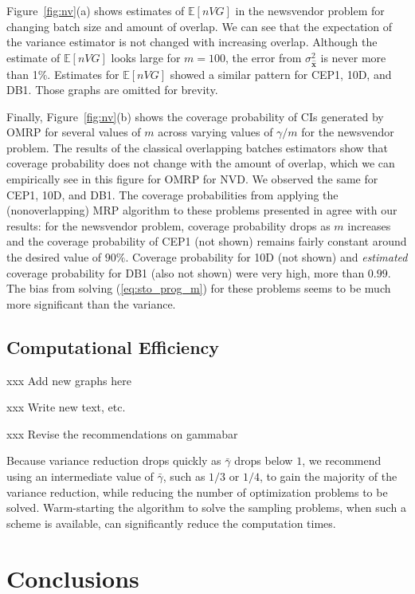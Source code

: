 \documentclass[12pt]{article}
\newcommand{\e}[1]{\mathbb{E} \left[ #1 \right]
}
\newcommand{\x}{\mathbf{x}}
\newcommand{\xh}{{\hat{\x}}}
\newcommand{\gammab}{\bar{\gamma}}
\begin{document}
Figure~\ref{fig:nv}(a) shows estimates of $\e{nVG}$ in the newsvendor problem for changing batch size and amount of overlap. 
We can see that the expectation of the variance estimator is not changed with increasing overlap. 
Although the estimate of $\e{nVG}$ looks large for $m=100$, the error from $\sigma^2_\xh$ is never more than 1\%.  
Estimates for $\e{nVG}$ showed a similar pattern for CEP1, 10D, and DB1.  
Those graphs are omitted for brevity.

Finally, Figure~\ref{fig:nv}(b) shows the coverage probability of CIs generated by OMRP for several values of $m$ across varying values of $\gamma/m$ for the newsvendor problem.  
The results of the classical overlapping batches estimators show that coverage probability does not change with the amount of overlap, which we can  empirically see in this figure for OMRP for NVD.
We observed the same for CEP1, 10D, and DB1.  
The coverage probabilities from applying the (nonoverlapping) MRP algorithm to these problems presented in \citep{Bayraksan2006} agree with our results: for the newsvendor problem, coverage probability drops as $m$ increases and the coverage probability of CEP1 (not shown) remains fairly constant around the desired value of $90\%$. 
Coverage probability for 10D (not shown) and {\it estimated} coverage probability for DB1 (also not shown) were very high, more than $0.99$.  
The bias from solving (\ref{eq:sto_prog_m}) for these problems seems to be much more significant than the variance.

\subsection{Computational Efficiency}
\label{ssec:compeff}

xxx Add new graphs here \bigskip 

xxx Write new text, etc. \bigskip 

xxx Revise the recommendations on gammabar \bigskip 

Because variance reduction drops quickly as $\gammab$ drops below $1$, we recommend using an intermediate value of $\gammab$, such as $1/3$ or $1/4$, to gain the majority of the variance reduction, while reducing the number of optimization problems to be solved. 
Warm-starting the algorithm to solve the sampling problems, when such a scheme is available, can significantly reduce the computation times.

\section{Conclusions}
\label{sec:concl}
\end{document}
